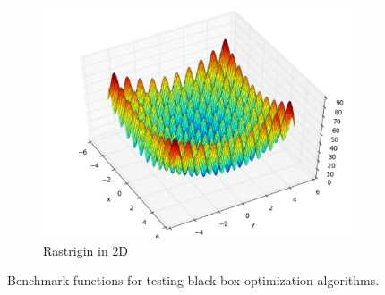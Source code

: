 \begin{figure}[ht]
\begin{subfigure}{0.24\textwidth}
    \centering\includegraphics[width=\textwidth]{Chapter5/img/rastrigin.pdf}
    \caption{Rastrigin in 2D}
  \end{subfigure}
  \caption{Benchmark functions for testing black-box optimization algorithms.}
  \label{fig:benchmarks}
\end{figure}

